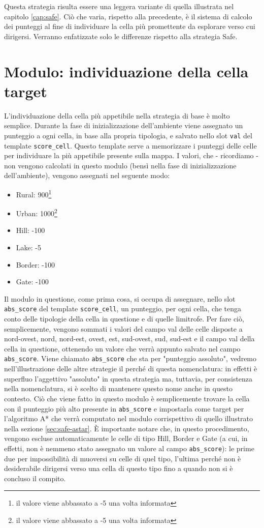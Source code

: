 Questa strategia risulta essere una leggera variante di quella illustrata nel capitolo \ref{cap:safe}. Ciò che varia, rispetto alla precedente, è il sistema di calcolo dei punteggi al fine di individuare la cella più promettente da esplorare verso cui dirigersi. Verranno enfatizzate solo le differenze rispetto alla strategia Safe.

\section{Modulo: individuazione della cella target} \label{sec:base-target}
L'individuazione della cella più appetibile nella strategia di base è molto semplice. Durante la fase di inizializzazione dell'ambiente viene assegnato un punteggio a ogni cella, in base alla propria tipologia, e salvato nello slot \texttt{val} del template \texttt{score\_cell}. Questo template serve a memorizzare i punteggi delle celle per individuare la più appetibile presente sulla mappa. I valori, che - ricordiamo - non vengono calcolati in questo modulo (bensì nella fase di inizializzazione dell'ambiente), vengono assegnati nel seguente modo:
\begin{itemize}
	\item Rural: 900\footnote{il valore viene abbassato a -5 una volta informata}
	\item Urban: 1000\footnote{il valore viene abbassato a -5 una volta informata}
	\item Hill: -100
	\item Lake: -5
	\item Border: -100
	\item Gate: -100
\end{itemize}
Il modulo in questione, come prima cosa, si occupa di assegnare, nello slot \texttt{abs\_score} del template \texttt{score\_cell}, un punteggio, per ogni cella, che tenga conto delle tipologie della cella in questione e di quelle limitrofe. Per fare ciò, semplicemente, vengono sommati i valori del campo val delle celle disposte a nord-ovest, nord, nord-est, ovest, est, sud-ovest, sud, sud-est e il campo val della cella in questione, ottenendo un valore che verrà appunto salvato nel campo \texttt{abs\_score}. Viene chiamato \texttt{abs\_score} che sta per "punteggio assoluto", vedremo nell'illustrazione delle altre strategie il perché di questa nomenclatura: in effetti è superfluo l'aggettivo "assoluto" in questa strategia ma, tuttavia, per consistenza nella nomenclatura, si è scelto di mantenere questo nome anche in questo contesto.
Ciò che viene fatto in questo modulo è semplicemente trovare la cella con il punteggio più alto presente in \texttt{abs\_score} e impostarla come target per l'algoritmo A* che verrà computato nel modulo corrispettivo di quello illustrato nella sezione \ref{sec:safe-astar}. È importante notare che, in questo procedimento, vengono escluse automaticamente le celle di tipo Hill, Border e Gate (a cui, in effetti, non è nemmeno stato assegnato un valore al campo \texttt{abs\_score}): le prime due per impossibilità di muoversi su celle di quel tipo, l'ultima perché non è desiderabile dirigersi verso una cella di questo tipo fino a quando non si è concluso il compito.
